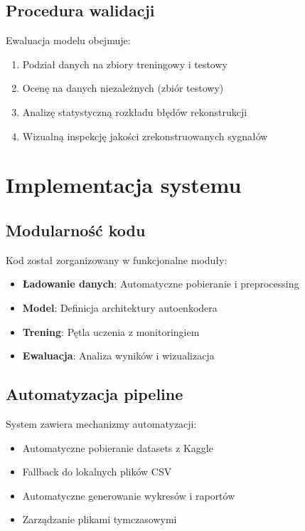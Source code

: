 \documentclass[12pt,a4paper]{article}
\begin{document}
\subsection{Procedura walidacji}

Ewaluacja modelu obejmuje:
\begin{enumerate}
    \item Podział danych na zbiory treningowy i testowy
    \item Ocenę na danych niezależnych (zbiór testowy)
    \item Analizę statystyczną rozkładu błędów rekonstrukcji
    \item Wizualną inspekcję jakości zrekonstruowanych sygnałów
\end{enumerate}

\section{Implementacja systemu}

\subsection{Modularność kodu}

Kod został zorganizowany w funkcjonalne moduły:
\begin{itemize}
    \item \textbf{Ładowanie danych}: Automatyczne pobieranie i preprocessing
    \item \textbf{Model}: Definicja architektury autoenkodera
    \item \textbf{Trening}: Pętla uczenia z monitoringiem
    \item \textbf{Ewaluacja}: Analiza wyników i wizualizacja
\end{itemize}

\subsection{Automatyzacja pipeline}

System zawiera mechanizmy automatyzacji:
\begin{itemize}
    \item Automatyczne pobieranie datasets z Kaggle
    \item Fallback do lokalnych plików CSV
    \item Automatyczne generowanie wykresów i raportów
    \item Zarządzanie plikami tymczasowymi
\end{itemize}
\end{document}
